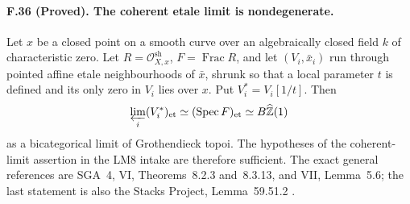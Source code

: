 \paragraph{F.36 (Proved). The coherent etale limit is nondegenerate.}
Let $x$ be a closed point on a smooth curve over an algebraically closed
field $k$ of characteristic zero. Let $R=\mathcal O_{X,x}^{\mathrm{sh}}$,
$F=\operatorname{Frac}R$, and let $(V_i,\bar x_i)$ run through pointed
affine etale neighbourhoods of $\bar x$, shrunk so that a local parameter
$t$ is defined and its only zero in $V_i$ lies over $x$. Put
$V_i^*=V_i[1/t]$. Then
\[
 \varprojlim_i (V_i^*)_{\mathrm{et}}
   \simeq (\operatorname{Spec}F)_{\mathrm{et}}
   \simeq B\widehat{\mathbb Z}(1)
\]
as a bicategorical limit of Grothendieck topoi. The hypotheses of the
coherent-limit assertion in the LM8 intake are therefore sufficient.
The exact general references are SGA~4, VI, Theorems~8.2.3 and~8.3.13,
and VII, Lemma~5.6; the last statement is also the Stacks Project,
Lemma~59.51.2 \cite{SGA4II,StacksEtaleLimits}.

